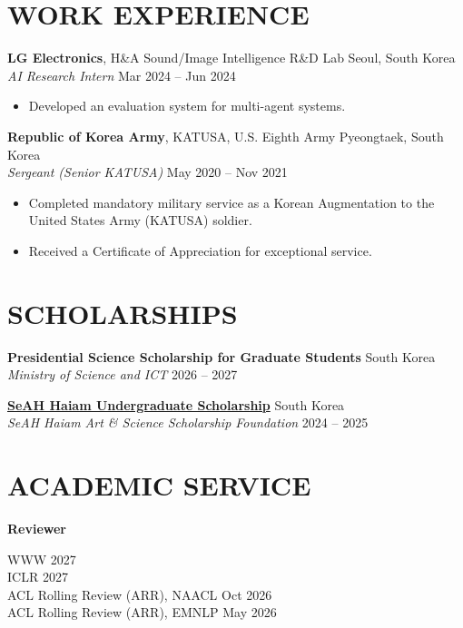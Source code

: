 \documentclass[a4paper,10pt]{extarticle}
\begin{document}
\section*{WORK EXPERIENCE}
\noindent
\textbf{LG Electronics}, H\&A Sound/Image Intelligence R\&D Lab \hfill Seoul, South Korea\\
\textit{AI Research Intern} \hfill Mar 2024 -- Jun 2024
\begin{itemize}
    \item Developed an evaluation system for multi-agent systems.
\end{itemize}


\noindent
\textbf{Republic of Korea Army}, KATUSA, U.S. Eighth Army \hfill Pyeongtaek, South Korea\\
\textit{Sergeant (Senior KATUSA)} \hfill May 2020 -- Nov 2021
\begin{itemize}
    \item Completed mandatory military service as a Korean Augmentation to the United States Army (KATUSA) soldier.
    \item Received a Certificate of Appreciation for exceptional service.
\end{itemize}

\section*{SCHOLARSHIPS}
\noindent
\textbf{Presidential Science Scholarship for Graduate Students} \hfill South Korea\\
\textit{Ministry of Science and ICT} \hfill 2026 -- 2027

\medskip
\noindent
\textbf{\href{https://haiam.seah.co.kr/main/}{SeAH Haiam Undergraduate Scholarship}} \hfill South Korea\\
\textit{SeAH Haiam Art \& Science Scholarship Foundation} \hfill 2024 -- 2025

\section*{ACADEMIC SERVICE}
\textbf{Reviewer}\par
WWW \hfill 2027\\
ICLR \hfill 2027\\
ACL Rolling Review (ARR), NAACL \hfill Oct 2026\\
ACL Rolling Review (ARR), EMNLP \hfill May 2026
\end{document}

